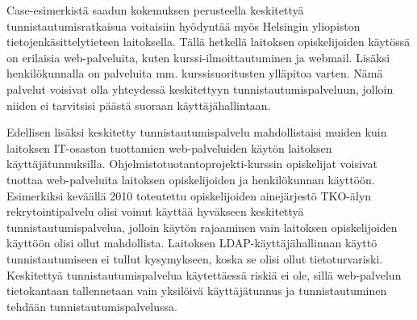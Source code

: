 Case-esimerkistä saadun kokemuksen perusteella keskitettyä tunnistautumisratkaisua voitaisiin hyödyntää myös Helsingin yliopiston tietojenkäsittelytieteen laitoksella. Tällä hetkellä laitoksen opiskelijoiden käytössä on erilaisia web-palveluita, kuten kurssi-ilmoittautuminen ja webmail. Lisäksi henkilökunnalla on palveluita mm. kurssisuoritusten ylläpitoa varten. Nämä palvelut voisivat olla yhteydessä keskitettyyn tunnistautumispalveluun, jolloin niiden ei tarvitsisi päästä suoraan käyttäjähallintaan.

Edellisen lisäksi keskitetty tunnistautumispalvelu mahdollistaisi muiden kuin laitoksen IT-osaston tuottamien web-palveluiden käytön laitoksen käyttäjätunnuksilla. Ohjelmistotuotantoprojekti-kurssin opiskelijat voisivat tuottaa web-palveluita laitoksen opiskelijoiden ja henkilökunnan käyttöön. Esimerkiksi keväällä 2010 toteutettu opiskelijoiden ainejärjestö TKO-älyn rekrytointipalvelu olisi voinut käyttää hyväkseen keskitettyä tunnistautumispalvelua, jolloin käytön rajaaminen vain laitoksen opiskelijoiden käyttöön olisi ollut mahdollista. Laitoksen LDAP-käyt\-tä\-jä\-hal\-lin\-nan käyttö tunnistautumiseen ei tullut kysymykseen, koska se olisi ollut tietoturvariski. Keskitettyä tunnistautumispalvelua käytettäessä riskiä ei ole, sillä web-palvelun tietokantaan tallennetaan vain yksilöivä käyttäjätunnus ja tunnistautuminen tehdään tunnistautumispalvelussa.